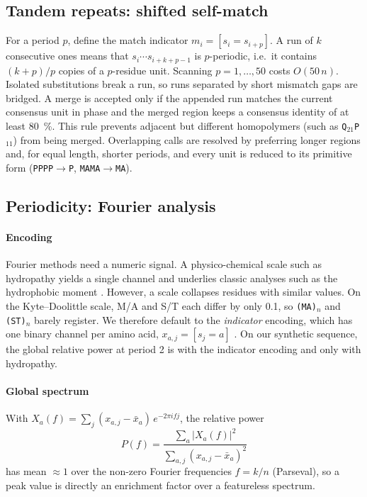 \documentclass[11pt,a4paper]{article}
\newcommand{\seq}[1]{\texttt{#1}}
\begin{document}
\subsection{Tandem repeats: shifted self-match}\label{sec:tandem}
For a period $p$, define the match indicator $m_i = [s_i = s_{i+p}]$. A run of $k$ consecutive ones means that
$s_i \cdots s_{i+k+p-1}$ is $p$-periodic, i.e.\ it contains $(k+p)/p$ copies of a $p$-residue unit. Scanning
$p = 1, \dots, 50$ costs $O(50\,n)$. Isolated substitutions break a run, so runs separated by short mismatch gaps
are bridged. A merge is accepted only if the appended run matches the current consensus unit in phase and the
merged region keeps a consensus identity of at least \SI{80}{\percent}. This rule prevents adjacent but
different homopolymers (such as \seq{Q$_{21}$P$_{11}$}) from being merged. Overlapping calls are resolved by
preferring longer regions and, for equal length, shorter periods, and every unit is reduced to its primitive
form (\seq{PPPP}$\to$\seq{P}, \seq{MAMA}$\to$\seq{MA}).

\subsection{Periodicity: Fourier analysis}\label{sec:fourier}
\paragraph{Encoding} Fourier methods need a numeric signal. A physico-chemical scale such as hydropathy
\cite{kyte1982hydropathy,hopp1981prediction,grantham1974difference,zimmerman1968characterization}
yields a single channel and underlies classic analyses such as the hydrophobic moment
\cite{eisenberg1984moment}. However, a scale collapses residues with similar values. On the
Kyte--Doolittle scale, M/A and S/T each differ by only 0.1, so \seq{(MA)$_n$} and \seq{(ST)$_n$} barely register.
We therefore default to the \emph{indicator} encoding, which has one binary channel per amino acid,
$x_{a,j} = [s_j = a]$ \cite{voss1992evolution}. On our synthetic sequence, the global relative power at period 2 is
\toyNyquistIndicator{} with the indicator encoding and only \toyNyquistKD{} with hydropathy.

\paragraph{Global spectrum} With $X_a(f) = \sum_j (x_{a,j}-\bar x_a)\,e^{-2\pi i f j}$, the relative power
\begin{equation}
  P(f) = \frac{\sum_a |X_a(f)|^2}{\sum_{a,j}(x_{a,j}-\bar x_a)^2}
\end{equation}
has mean $\approx 1$ over the non-zero Fourier frequencies $f = k/n$ (Parseval), so a peak value is directly an
enrichment factor over a featureless spectrum.
\end{document}
